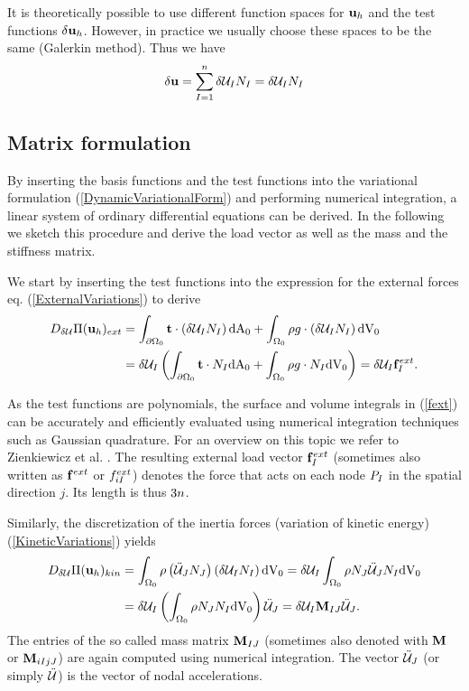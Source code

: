 It is theoretically possible to use different function spaces for $\mathbf {u}  _h$ and the test functions $\delta \mathbf {u}  _h$. However, in practice we usually choose these spaces to be the same (Galerkin method). Thus we have
\begin{equation}
\delta \mathbf {u}  = \sum _{I=1} ^{n} \delta \mathcal{U} _I N_I   =  \delta \mathcal{U} _I N_I 
\end{equation}

\subsection{Matrix formulation}
\label{SectionMatrixFormulation}

By inserting the basis functions and the test functions into the variational formulation (\ref{DynamicVariationalForm}) and performing numerical integration, a linear system of ordinary differential equations can be derived. In the following we sketch this procedure and derive the load vector as well as the mass and the stiffness matrix.

We start by inserting the test functions into the expression for the external forces eq. (\ref{ExternalVariations}) to derive 
\begin{alignat}{1}
D_{\delta \mathcal{U} } \Pi (\mathbf {u}  _h) _{ext} &= \int _{\partial \Omega _0}  \mathbf {t}  \cdot \left( \delta \mathcal{U}  _I N_I  \right)   \textnormal{dA}_0  +  \int _{\Omega _0}  \rho g \cdot \left( \delta \mathcal{U}  _I N_I  \right)  \textnormal{dV}_0 \\
&= \delta \mathcal{U}  _I \left( \int _{\partial \Omega _0}  \mathbf {t}  \cdot  N_I     \textnormal{dA}_0  +  \int _{\Omega _0}  \rho g \cdot N_I   \textnormal{dV}_0  \right)  = \delta \mathcal{U}  _I \mathbf f ^{ext}_I.
\label{fext}
\end{alignat}

As the test functions are polynomials, the surface and volume integrals in (\ref{fext}) can be accurately and efficiently evaluated using numerical integration techniques such as Gaussian quadrature. For an overview on this topic we refer to Zienkiewicz et al. \cite{Zienkiewicz1977}. The resulting external load vector $\mathbf f ^{ext}_I$ (sometimes also written as $\mathbf f ^{ext}$ or $f ^{ext}_{iI}$) denotes the force that acts on each node $P_I$ in the spatial direction $j$. Its length is thus $3 n$.

Similarly, the discretization of the inertia forces (variation of kinetic energy) (\ref{KineticVariations}) yields
\begin{alignat}{1}
D_{\delta \mathcal{U} } \Pi (\mathbf {u}  _h) _{kin} &= \int _{\Omega _0}  \rho \left( \ddot{\mathcal{U} }_J N_J   \right)  \left( \delta \mathcal{U}  _I N_I  \right)   \textnormal{dV}_0 =  \delta \mathcal{U}  _I \int _{\Omega _0}  \rho N_J  \ddot{\mathcal{U} }_J    N_I   \textnormal{dV}_0 \\
&=  \delta \mathcal{U} _I \left( \int _{\Omega _0}  \rho N_J   N_I   \textnormal{dV}_0 \right) \ddot{\mathcal{U} }_J = \delta \mathcal{U}  _I \mathbf M_{IJ} \ddot{\mathcal{U} }_J.
\label{MassMatrix}
\end{alignat}
The entries of the so called mass matrix $\mathbf M_{IJ}$ (sometimes also denoted with $\mathbf M$ or $\mathbf M_{iIjJ}$) are again computed using numerical integration. The vector $\ddot{\mathcal{U} }_J$ (or simply $\ddot{\mathcal{U} }$) is the vector of nodal accelerations. 

